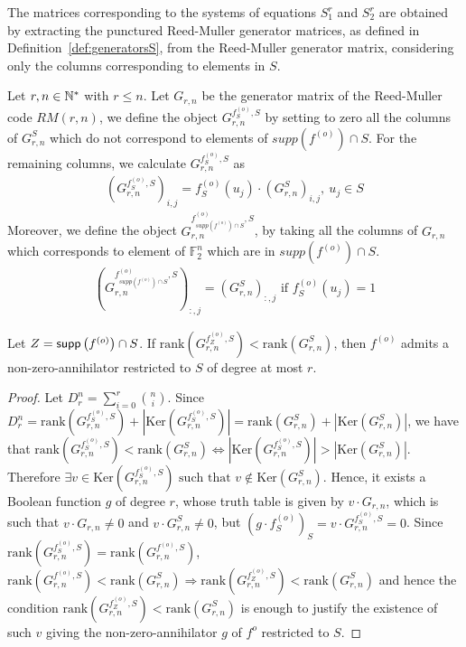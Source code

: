 \documentclass[11pt]{llncs}
\begin{document}
The matrices corresponding to the systems of equations $S_1^r$ and $S_2^r$ are obtained by extracting the punctured Reed-Muller generator matrices, as defined in Definition~\ref{def:generatorsS}, from the Reed-Muller generator matrix, considering only the columns corresponding to elements in $S$.


\begin{definition}\label{def:generatorsS}
Let $r,n\in\mathbb{N}^*$ with $r\leq n$. Let $G_{r,n}$ be the generator matrix of the Reed-Muller code $RM(r,n)$, we define the object $G_{r,n}^{f^{(o)}_S,S}$ by setting to zero all the columns of $G_{r,n}^S$ which do not correspond to elements of $supp(f^{(o)} )\cap S$. For the remaining columns, we calculate $G_{r,n}^{f_S^{(o)},S}$ as
	\begin{align*}
	\left(G_{r,n}^{f^{(o)}_S,S}\right)_{i,j} = f_S^{(o)}(u_j) \cdot \left(G_{r,n}^S\right)_{i,j}, \ u_j \in S
	\end{align*}
	Moreover, we define the object $G_{r,n}^{f^{(o)}_{supp\left(f^{(o)}\right) \cap S},S}$, by taking all the columns of $G_{r,n}$ which corresponds to element of $\mathbb{F}_2^n$ which are in $supp\left(f^{(o)}\right) \cap S$.
	\begin{align}
	\left(G_{r,n}^{f_{supp\left(f^{(o)}\right) \cap S}^{(o)},S}\right)_{:,j} = (G_{r,n}^S)_{:,j} \mbox{ if } f_S^{(o)}(u_j) = 1 \label{eq:f-generatorRestrictedSet}
	\end{align}
\end{definition}

\begin{proposition}\label{prop:compareranks}
	Let $Z = \mathsf{supp}\left(f^{(o)}\right) \cap S$.
	If $\text{rank}\left(G^{f_{Z}^{(o)},S}_{r,n}\right) < \text{rank}(G^{S}_{r,n})$, then $f^{(o)}$ admits a non-zero-annihilator restricted to $S$ of degree at most $r$.
\end{proposition}

\begin{proof}
	Let $D_r^n = \sum_{i=0}^r \binom{n}{i}$. Since $D_r^n = \text{rank}(G^{f^{(o)}_S,S}_{r,n}) + |\text{Ker}(G^{f^{(o)}_S,S}_{r,n})| =  \text{rank}(G^{S}_{r,n}) + |\text{Ker}(G^{S}_{r,n})|$, we have that
	$\text{rank}(G^{f_S^{(o)},S}_{r,n}) < \text{rank}(G^{S}_{r,n}) \iff |\text{Ker}(G^{f_S^{(o)},S}_{r,n})| > |\text{Ker}(G^{S}_{r,n})|$. 
	Therefore $\exists v\in \text{Ker}(G^{f_S^{(o)},S}_{r,n}) \mbox{ such that }v\not\in \text{Ker}(G^{S}_{r,n})$. 
	Hence, it exists a Boolean function $g$ of degree $r$, whose truth table is given by $v \cdot G_{r,n}$, which is such that $v \cdot G_{r,n}\neq 0$ and $v \cdot G_{r,n}^{S}\neq 0$, but $(g \cdot f_S^{(o)})_S = v \cdot G_{r,n}^{f_S^{(o)},S} = 0$.
	Since $\text{rank}\left(G_{r,n}^{f_S^{(o)}, S}\right) = \text{rank}\left(G_{r,n}^{f^{(o)}, S}\right)$, $\text{rank}(G^{f^{(o)},S}_{r,n}) < \text{rank}(G^{S}_{r,n}) \Rightarrow \text{rank}(G^{f_Z^{(o)},S}_{r,n}) < \text{rank}(G^{S}_{r,n})$ and hence the condition $\text{rank}(G^{f_Z^{(o)},S}_{r,n}) < \text{rank}(G^{S}_{r,n})$ is enough to justify the existence of such $v$ giving the non-zero-annihilator $g$ of $f^{o}$ restricted to $S$.
\end{proof}
\end{document}
